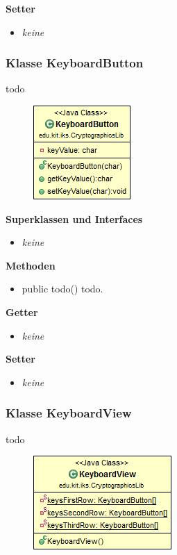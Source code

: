 \documentclass{article}
\begin{document}
      \textbf{Setter}
      \begin{itemize}
        \item \textit{keine}
      \end{itemize}
	
	\subsubsection{Klasse KeyboardButton}
	  todo
	
      \begin{figure}[H]
        \centering
        \includegraphics{resources/edu-kit-iks-CryptographicsLib-KeyboardButton}
      \end{figure}
	
      \textbf{Superklassen und Interfaces}
      \begin{itemize}
        \item \textit{keine}
      \end{itemize}
	
      \textbf{Methoden}
      \begin{itemize}
        \item public todo() \newline
          todo.
      \end{itemize}
      
      \textbf{Getter}
      \begin{itemize}
		\item \textit{keine}
      \end{itemize}
      
      \textbf{Setter}
      \begin{itemize}
        \item \textit{keine}
      \end{itemize}
	
	\subsubsection{Klasse KeyboardView}
	  todo
	
      \begin{figure}[H]
        \centering
        \includegraphics{resources/edu-kit-iks-CryptographicsLib-KeyboardView}
      \end{figure}
	
\end{document}
